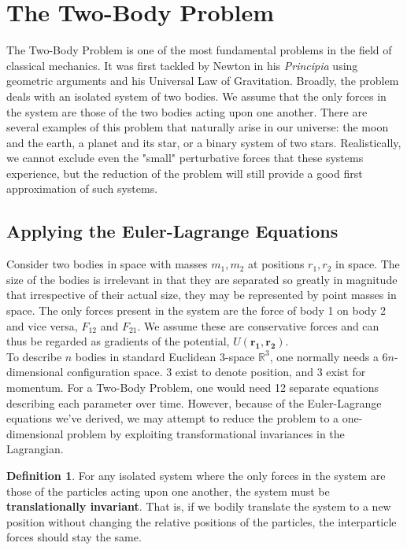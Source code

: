 \documentclass[10.5pt, psamsfonts]{amsart}
\theoremstyle{definition}
\newtheorem{defn}[thm]{Definition}
\theoremstyle{remark}
\numberwithin{equation}{section}
\begin{document}
\section{The Two-Body Problem}
The Two-Body Problem is one of the most fundamental problems in the field of classical mechanics. It was first tackled by Newton in his \textit{Principia} using geometric arguments and his Universal Law of Gravitation. Broadly, the problem deals with an isolated system of two bodies. We assume that the only forces in the system are those of the two bodies acting upon one another. There are several examples of this problem that naturally arise in our universe: the moon and the earth, a planet and its star, or a binary system of two stars. Realistically, we cannot exclude even the "small" perturbative forces that these systems experience, but the reduction of the problem will still provide a good first approximation of such systems.

\subsection{Applying the Euler-Lagrange Equations}
Consider two bodies in space with masses $m_1, m_2$ at positions $r_1, r_2$ in space. The size of the bodies is irrelevant in that they are separated so greatly in magnitude that irrespective of their actual size, they may be represented by point masses in space. The only forces present in the system are the force of body 1 on body 2 and vice versa, $F_{12} $ and $F_{21}$. We assume these are conservative forces and can thus be regarded as gradients of the potential, $U(\bm{r_1}, \bm{r_2})$.\\

To describe $n$ bodies in standard Euclidean 3-space $\mathbb{R}^3$, one normally needs a $6n$-dimensional configuration space. 3 exist to denote position, and 3 exist for momentum. For a Two-Body Problem, one would need 12 separate equations describing each parameter over time. However, because of the Euler-Lagrange equations we've derived, we may attempt to reduce the problem to a one-dimensional problem by exploiting transformational invariances in the Lagrangian.

\begin{defn}
  For any isolated system where the only forces in the system are those of the particles acting upon one another, the system must be \textbf{translationally invariant}. That is, if we bodily translate the system to a new position without changing the relative positions of the particles, the interparticle forces should stay the same.
\end{defn}
\end{document}
